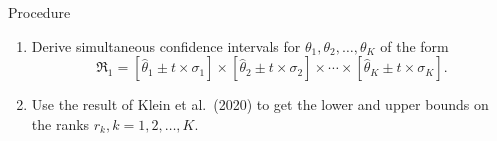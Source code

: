\documentclass[
  11pt,
  ignorenonframetext,
]{beamer}
\providecommand{\tightlist}{%
  \setlength{\itemsep}{0pt}\setlength{\parskip}{0pt}}
\begin{document}
\begin{frame}{Procedure}
\label{procedure}
\begin{enumerate}[<+->]
\tightlist
\item
  Derive simultaneous confidence intervals for
  \(\theta_1,\theta_2,\ldots,\theta_K\) of the form \begin{equation}
  \mathfrak{R}_1 = 
  [\hat{\theta}_1 \pm t \times \sigma_1] \times
  [\hat{\theta}_2 \pm t \times \sigma_2] \times
  \cdots \times
  [\hat{\theta}_K \pm t \times \sigma_K].
  \label{eq:rev1}
  \end{equation}
\end{enumerate}

\begin{enumerate}[<+->]
\setcounter{enumi}{1}
\tightlist
\item
  Use the result of Klein et al.~(2020) to get the lower and upper
  bounds on the ranks \(r_k, k=1,2,\ldots,K\).
\end{enumerate}

\end{frame}
\end{document}
